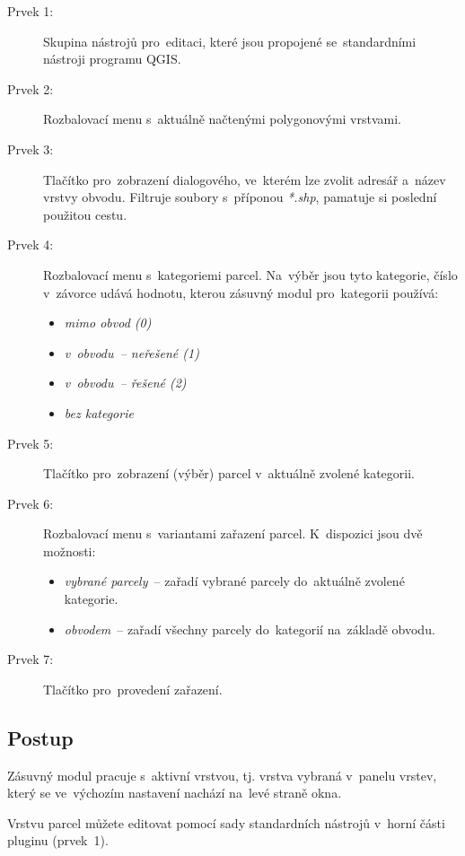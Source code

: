 \begin{description}
	\item[Prvek 1:] Skupina nástrojů pro~editaci, které jsou
propojené se~standardními nástro\-ji programu QGIS.
	\item[Prvek 2:] Rozbalovací menu s~aktuálně načtenými
polygonovými vrstvami.
	\item[Prvek 3:] Tlačítko pro~zobrazení dialogového, ve~kterém
lze zvolit adresář a~název vrstvy obvodu. Filtruje soubory s~příponou
\textit{*.shp}, pamatuje si poslední použitou cestu.
	\item[Prvek 4:] Rozbalovací menu s~kategoriemi
parcel. Na~výběr jsou tyto kategorie, číslo v~závorce udává hodnotu,
kterou zásuvný modul pro~kategorii používá:
	\begin{itemize}[leftmargin=1.5cm, noitemsep]
		\item \textit{mimo obvod (0)}
		\item \textit{v~obvodu~– neřešené (1)}
		\item \textit{v~obvodu~– řešené (2)}
		\item \textit{bez kategorie}
	\end{itemize}
	\item[Prvek 5:] Tlačítko pro~zobrazení (výběr) parcel
v~aktuálně zvolené kategorii.
	\item[Prvek 6:] Rozbalovací menu s~variantami zařazení
parcel. K~dispozici jsou dvě možnosti:
	\begin{itemize}[leftmargin=1.5cm, noitemsep]
		\item \textit{vybrané parcely}~– zařadí vybrané
parcely do~aktuálně zvolené kategorie.
		\item \textit{obvodem}~– zařadí všechny parcely
do~kategorií na~základě obvodu.
	\end{itemize}
	\item[Prvek 7:] Tlačítko pro~provedení zařazení.
\end{description}

\subsection{Postup}
\label{manual_editace_postup}

Zásuvný modul pracuje s~aktivní vrstvou, tj. vrstva vybraná v~panelu
vrstev, který se ve~výchozím nastavení nachází na~levé straně okna.

Vrstvu parcel můžete editovat pomocí sady standardních nástrojů
v~horní části pluginu (prvek~1).

